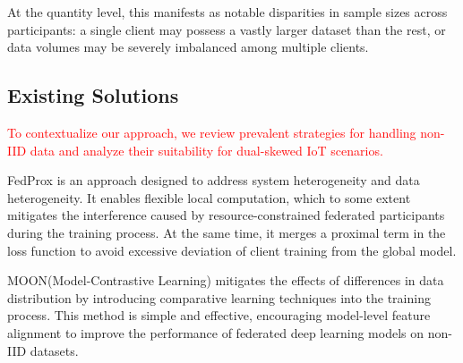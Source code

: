 \documentclass[journal,twoside,web]{ieeecolor}
\newcommand{\rev}[1]{\textcolor{red}{#1}}
\begin{document}
At the quantity level, this manifests as notable disparities in sample sizes across participants: a single client may possess a vastly larger dataset than the rest, or data volumes may be severely imbalanced among multiple clients.



\subsection{Existing Solutions}

\rev{To contextualize our approach, we review prevalent strategies for handling non-IID data and analyze their suitability for dual-skewed IoT scenarios.}

FedProx\cite{fedprox} is an approach designed to address system heterogeneity and data heterogeneity. It enables flexible local computation, which to some extent mitigates the interference caused by resource-constrained federated participants during the training process. At the same time, it merges a proximal term in the loss function to avoid excessive deviation of client training from the global model.

MOON(Model-Contrastive Learning) \cite{moon} mitigates the effects of differences in data distribution by introducing comparative learning techniques into the training process. This method is simple and effective, encouraging model-level feature alignment to improve the performance of federated deep learning models on non-IID datasets. 

\end{document}
